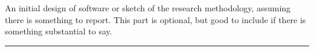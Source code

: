 
An initial design of software or sketch of the research methodology, assuming there is something to report.
This part is optional, but good to include if there is something substantial to say.

\rule{\textwidth}{2pt}

\lipsum
